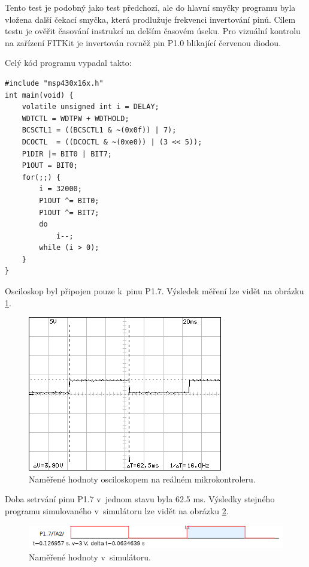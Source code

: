 Tento test je podobný jako test předchozí, ale do hlavní smyčky programu byla vložena další čekací smyčka, která prodlužuje frekvenci invertování pinů. Cílem testu je ověřit časování instrukcí na delším časovém úseku. Pro vizuální kontrolu na zařízení FITKit je invertován rovněž pin P1.0 blikající červenou diodou.

Celý kód programu vypadal takto:

\lstset{language=XML, numbers=left, frame=single, breaklines=true, tabsize=2, xleftmargin=20pt}
\begin{lstlisting}
#include "msp430x16x.h"
int main(void) {
	volatile unsigned int i = DELAY;
	WDTCTL = WDTPW + WDTHOLD;
	BCSCTL1 = ((BCSCTL1 & ~(0x0f)) | 7);
	DCOCTL  = ((DCOCTL & ~(0xe0)) | (3 << 5));
	P1DIR |= BIT0 | BIT7;
	P1OUT = BIT0;
	for(;;) {
		i = 32000;
		P1OUT ^= BIT0;
		P1OUT ^= BIT7;
		do
			i--;
		while (i > 0);
	}
}
\end{lstlisting}

Osciloskop byl připojen pouze k~pinu P1.7. Výsledek měření lze vidět na obrázku \ref{fig:dso05osc}.

\begin{figure}[ht]
\centering
\includegraphics[trim=0cm 0cm 0cm 0cm]{fig/dso05}
\caption{Naměřené hodnoty osciloskopem na reálném mikrokontroleru.}
\label{fig:dso05osc}
\end{figure}

Doba setrvání pinu P1.7 v~jednom stavu byla 62.5 ms. Výsledky stejného programu simulovaného v~simulátoru lze vidět na obrázku \ref{fig:dso05sim}.

\begin{figure}[ht]
\centering
\includegraphics[trim=0cm 0cm 0cm 0cm, scale=0.8]{fig/dso05sim}
\caption{Naměřené hodnoty v~simulátoru.}
\label{fig:dso05sim}
\end{figure}

